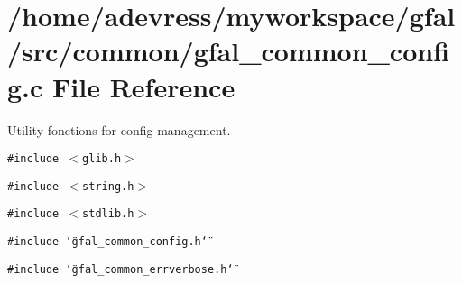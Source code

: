 \section{/home/adevress/myworkspace/gfal/src/common/gfal\_\-common\_\-config.c File Reference}
\label{gfal__common__config_8c}
Utility fonctions for config management. 

{\tt \#include $<$glib.h$>$}\par
{\tt \#include $<$string.h$>$}\par
{\tt \#include $<$stdlib.h$>$}\par
{\tt \#include \char`\"{}gfal\_\-common\_\-config.h\char`\"{}}\par
{\tt \#include \char`\"{}gfal\_\-common\_\-errverbose.h\char`\"{}}\par
